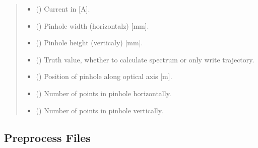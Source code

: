 \documentclass[letterpaper,10pt,english]{sphinxmanual}
\begin{document}
\begin{fulllineitems}
\begin{fulllineitems}
\begin{quote}
\begin{description}
\begin{itemize}
\item {} 
\sphinxAtStartPar
{} () \textendash{} Current in {[}A{]}.

\item {} 
\sphinxAtStartPar
{} () \textendash{} Pinhole width (horizontal\sphinxhyphen{}z) {[}mm{]}.

\item {} 
\sphinxAtStartPar
{} () \textendash{} Pinhole height (vertical\sphinxhyphen{}y) {[}mm{]}.

\item {} 
\sphinxAtStartPar
{} () \textendash{} Truth value, whether to calculate spectrum or only write trajectory.

\item {} 
\sphinxAtStartPar
{} () \textendash{} Position of pinhole along optical axis {[}m{]}.

\item {} 
\sphinxAtStartPar
{} () \textendash{} Number of points in pinhole horizontally.

\item {} 
\sphinxAtStartPar
{} () \textendash{} Number of points in pinhole vertically.

\end{itemize}

\end{description}\end{quote}

\end{fulllineitems}


\end{fulllineitems}



\subsection{Preprocess Files}
\label{\detokenize{API:preprocess-files}}
\end{document}
